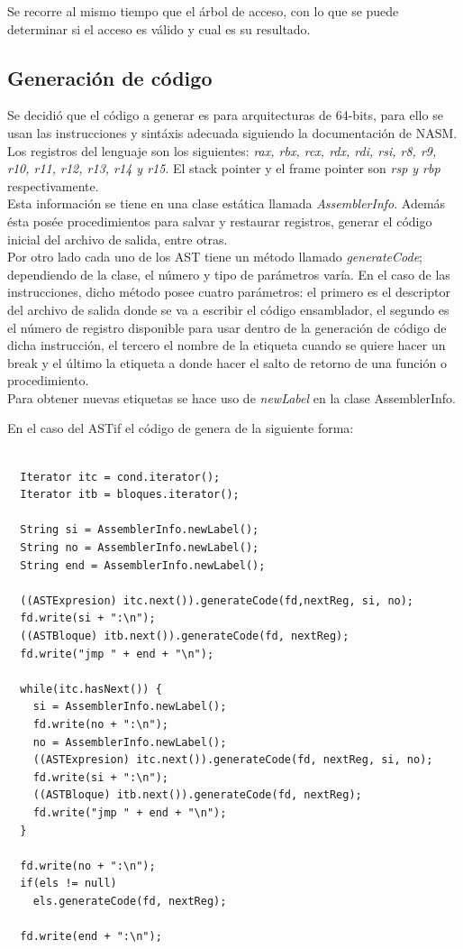 \documentclass[11pt, spanish]{report}
\begin{document}
Se recorre al mismo tiempo que el \'arbol de acceso, con lo que se puede determinar si el acceso es v\'alido y cual es su resultado.

\subsection{Generaci\'on de c\'odigo}
Se decidi\'o que el c\'odigo a generar es para arquitecturas de 64-bits, para ello se usan las instrucciones y sint\'axis adecuada siguiendo la documentaci\'on de NASM.\\

Los registros del lenguaje son los siguientes: \emph{rax, rbx, rcx, rdx, rdi, rsi, r8, r9, r10, r11, r12, r13, r14 y r15}. El stack pointer y el frame pointer son 
\emph{rsp y rbp} respectivamente.\\

Esta informaci\'on se tiene en una clase est\'atica llamada \emph{AssemblerInfo}. Adem\'as \'esta pos\'ee procedimientos para salvar y restaurar registros, generar 
el c\'odigo inicial del archivo de salida, entre otras.\\

Por otro lado cada uno de los AST tiene un m\'etodo llamado \emph{generateCode}; dependiendo de la clase, el n\'umero y tipo de par\'ametros var\'ia. En el caso de 
las instrucciones, dicho m\'etodo posee cuatro par\'ametros: el primero es el descriptor del archivo de salida donde se va a escribir el c\'odigo ensamblador, el segundo 
es el n\'umero de registro disponible para usar dentro de la generaci\'on de c\'odigo de dicha instrucci\'on, el tercero el nombre de la etiqueta cuando se quiere hacer un break y el \'ultimo la etiqueta a donde hacer el salto de retorno de una funci\'on o procedimiento. \\

Para obtener nuevas etiquetas se hace uso de \emph{newLabel} en la clase AssemblerInfo.

En el caso del ASTif el código de genera de la siguiente forma:

\begin{verbatim}

  Iterator itc = cond.iterator();
  Iterator itb = bloques.iterator();

  String si = AssemblerInfo.newLabel();
  String no = AssemblerInfo.newLabel();
  String end = AssemblerInfo.newLabel();

  ((ASTExpresion) itc.next()).generateCode(fd,nextReg, si, no);
  fd.write(si + ":\n");
  ((ASTBloque) itb.next()).generateCode(fd, nextReg);
  fd.write("jmp " + end + "\n");

  while(itc.hasNext()) {
    si = AssemblerInfo.newLabel();
    fd.write(no + ":\n");
    no = AssemblerInfo.newLabel();
    ((ASTExpresion) itc.next()).generateCode(fd, nextReg, si, no);
    fd.write(si + ":\n");
    ((ASTBloque) itb.next()).generateCode(fd, nextReg);
    fd.write("jmp " + end + "\n");
  }

  fd.write(no + ":\n");
  if(els != null)
    els.generateCode(fd, nextReg);

  fd.write(end + ":\n");

\end{verbatim}
\end{document}
